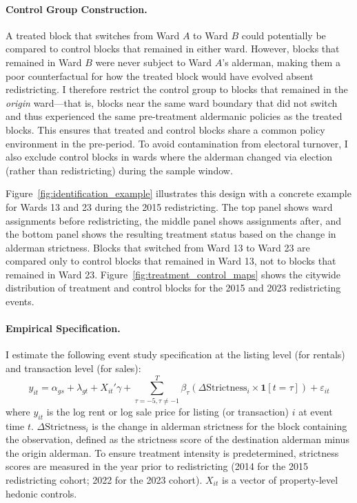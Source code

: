 \paragraph{Control Group Construction.} A treated block that switches from Ward $A$ to Ward $B$ could potentially be compared to control blocks that remained in either ward. However, blocks that remained in Ward $B$ were never subject to Ward $A$'s alderman, making them a poor counterfactual for how the treated block would have evolved absent redistricting. I therefore restrict the control group to blocks that remained in the \emph{origin} ward---that is, blocks near the same ward boundary that did not switch and thus experienced the same pre-treatment aldermanic policies as the treated blocks. This ensures that treated and control blocks share a common policy environment in the pre-period. To avoid contamination from electoral turnover, I also exclude control blocks in wards where the alderman changed via election (rather than redistricting) during the sample window.

Figure~\ref{fig:identification_example} illustrates this design with a concrete example for Wards 13 and 23 during the 2015 redistricting. The top panel shows ward assignments before redistricting, the middle panel shows assignments after, and the bottom panel shows the resulting treatment status based on the change in alderman strictness. Blocks that switched from Ward 13 to Ward 23 are compared only to control blocks that remained in Ward 13, not to blocks that remained in Ward 23. Figure~\ref{fig:treatment_control_maps} shows the citywide distribution of treatment and control blocks for the 2015 and 2023 redistricting events.

\paragraph{Empirical Specification.} I estimate the following event study specification at the listing level (for rentals) and transaction level (for sales):
%
\begin{equation}
\label{eq:event_study}
y_{it} = \alpha_{gs} + \lambda_{gt} + X_{it}'\gamma + \sum_{\tau=-5, \tau \neq -1}^{T} \beta_\tau \left( \Delta\text{Strictness}_i \times \mathbf{1}[t = \tau] \right) + \varepsilon_{it}
\end{equation}
%
\noindent where $y_{it}$ is the log rent or log sale price for listing (or transaction) $i$ at event time $t$. $\Delta\text{Strictness}_i$ is the change in alderman strictness for the block containing the observation, defined as the strictness score of the destination alderman minus the origin alderman. To ensure treatment intensity is predetermined, strictness scores are measured in the year prior to redistricting (2014 for the 2015 redistricting cohort; 2022 for the 2023 cohort). $X_{it}$ is a vector of property-level hedonic controls.

